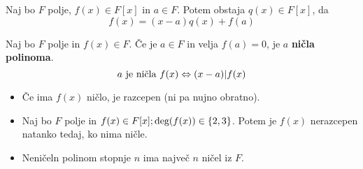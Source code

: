 \documentclass[a4paper,9pt]{extarticle}
\begin{document}
\begin{multicols}{3}
Naj bo $F$ polje, $f(x)\in F[x]$ in $a \in F$. Potem obstaja $q(x) \in F[x]$, da
\[f(x) = (x-a)q(x) + f(a)\]

Naj bo $F$ polje in $f(x)\in F$. Če je $a \in F$ in velja $f(a) = 0$, je $a$ \textbf{ničla polinoma}.
\[ a \textmd{ je ničla } f(x) \Leftrightarrow (x-a)|f(x)\]

\begin{itemize}
    \item Če ima $f(x)$ ničlo, je razcepen (ni pa nujno obratno).
    \item Naj bo $F$ polje in $f(x) \in F[x]; \textmd{deg}(f(x)) \in \{2,3\}$. Potem je $f(x)$ nerazcepen natanko tedaj, ko nima ničle.
    \item Neničeln polinom stopnje $n$ ima največ $n$ ničel iz $F$.
\end{itemize}



\end{multicols}
\end{document}
